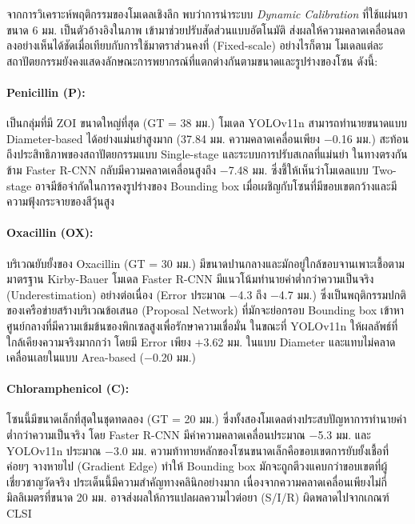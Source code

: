 จากการวิเคราะห์พฤติกรรมของโมเดลเชิงลึก พบว่าการนำระบบ \emph{Dynamic Calibration} ที่ใช้แผ่นยาขนาด 6 มม. เป็นตัวอ้างอิงในภาพ เข้ามาช่วยปรับสัดส่วนแบบอัตโนมัติ ส่งผลให้ความคลาดเคลื่อนลดลงอย่างเห็นได้ชัดเมื่อเทียบกับการใช้มาตราส่วนคงที่ (Fixed-scale) อย่างไรก็ตาม โมเดลแต่ละสถาปัตยกรรมยังคงแสดงลักษณะการพยากรณ์ที่แตกต่างกันตามขนาดและรูปร่างของโซน ดังนี้:

\paragraph{Penicillin (P):}
เป็นกลุ่มที่มี ZOI ขนาดใหญ่ที่สุด (GT = 38 มม.) โมเดล YOLOv11n สามารถทำนายขนาดแบบ Diameter-based ได้อย่างแม่นยำสูงมาก (37.84 มม. ความคลาดเคลื่อนเพียง $-$0.16 มม.) สะท้อนถึงประสิทธิภาพของสถาปัตยกรรมแบบ Single-stage และระบบการปรับสเกลที่แม่นยำ ในทางตรงกันข้าม Faster R-CNN กลับมีความคลาดเคลื่อนสูงถึง $-$7.48 มม. ซึ่งชี้ให้เห็นว่าโมเดลแบบ Two-stage อาจมีข้อจำกัดในการคงรูปร่างของ Bounding box เมื่อเผชิญกับโซนที่มีขอบเขตกว้างและมีความฟุ้งกระจายของสีวุ้นสูง

\paragraph{Oxacillin (OX):}
บริเวณยับยั้งของ Oxacillin (GT = 30 มม.) มีขนาดปานกลางและมักอยู่ใกล้ขอบจานเพาะเชื้อตามมาตรฐาน Kirby-Bauer โมเดล Faster R-CNN มีแนวโน้มทำนายค่าต่ำกว่าความเป็นจริง (Underestimation) อย่างต่อเนื่อง (Error ประมาณ $-$4.3 ถึง $-$4.7 มม.) ซึ่งเป็นพฤติกรรมปกติของเครือข่ายสร้างบริเวณข้อเสนอ (Proposal Network) ที่มักจะย่อกรอบ Bounding box เข้าหาศูนย์กลางที่มีความเข้มข้นของพิกเซลสูงเพื่อรักษาความเชื่อมั่น ในขณะที่ YOLOv11n ให้ผลลัพธ์ที่ใกล้เคียงความจริงมากกว่า โดยมี Error เพียง $+$3.62 มม. ในแบบ Diameter และแทบไม่คลาดเคลื่อนเลยในแบบ Area-based ($-$0.20 มม.)

\paragraph{Chloramphenicol (C):}
โซนนี้มีขนาดเล็กที่สุดในชุดทดลอง (GT = 20 มม.) ซึ่งทั้งสองโมเดลต่างประสบปัญหาการทำนายค่าต่ำกว่าความเป็นจริง โดย Faster R-CNN มีค่าความคลาดเคลื่อนประมาณ $-$5.3 มม. และ YOLOv11n ประมาณ $-$3.0 มม. ความท้าทายหลักของโซนขนาดเล็กคือขอบเขตการยับยั้งเชื้อที่ค่อยๆ จางหายไป (Gradient Edge) ทำให้ Bounding box มักจะถูกตีวงแคบกว่าขอบเขตที่ผู้เชี่ยวชาญวัดจริง ประเด็นนี้มีความสำคัญทางคลินิกอย่างมาก เนื่องจากความคลาดเคลื่อนเพียงไม่กี่มิลลิเมตรที่ขนาด 20 มม. อาจส่งผลให้การแปลผลความไวต่อยา (S/I/R) ผิดพลาดไปจากเกณฑ์ CLSI \cite{clsi2025}

